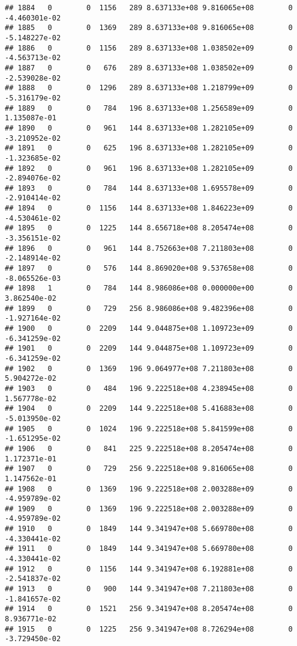\documentclass[
]{article}
\begin{document}
\begin{enumerate}
\begin{verbatim}
## 1884   0        0  1156   289 8.637133e+08 9.816065e+08        0 -4.460301e-02
## 1885   0        0  1369   289 8.637133e+08 9.816065e+08        0 -5.148227e-02
## 1886   0        0  1156   289 8.637133e+08 1.038502e+09        0 -4.563713e-02
## 1887   0        0   676   289 8.637133e+08 1.038502e+09        0 -2.539028e-02
## 1888   0        0  1296   289 8.637133e+08 1.218799e+09        0 -5.316179e-02
## 1889   0        0   784   196 8.637133e+08 1.256589e+09        0  1.135087e-01
## 1890   0        0   961   144 8.637133e+08 1.282105e+09        0 -3.210952e-02
## 1891   0        0   625   196 8.637133e+08 1.282105e+09        0 -1.323685e-02
## 1892   0        0   961   196 8.637133e+08 1.282105e+09        0 -2.894076e-02
## 1893   0        0   784   144 8.637133e+08 1.695578e+09        0 -2.910414e-02
## 1894   0        0  1156   144 8.637133e+08 1.846223e+09        0 -4.530461e-02
## 1895   0        0  1225   144 8.656718e+08 8.205474e+08        0 -3.356151e-02
## 1896   0        0   961   144 8.752663e+08 7.211803e+08        0 -2.148914e-02
## 1897   0        0   576   144 8.869020e+08 9.537658e+08        0 -8.065526e-03
## 1898   1        0   784   144 8.986086e+08 0.000000e+00        0  3.862540e-02
## 1899   0        0   729   256 8.986086e+08 9.482396e+08        0 -1.927164e-02
## 1900   0        0  2209   144 9.044875e+08 1.109723e+09        0 -6.341259e-02
## 1901   0        0  2209   144 9.044875e+08 1.109723e+09        0 -6.341259e-02
## 1902   0        0  1369   196 9.064977e+08 7.211803e+08        0  5.904272e-02
## 1903   0        0   484   196 9.222518e+08 4.238945e+08        0  1.567778e-02
## 1904   0        0  2209   144 9.222518e+08 5.416883e+08        0 -5.013950e-02
## 1905   0        0  1024   196 9.222518e+08 5.841599e+08        0 -1.651295e-02
## 1906   0        0   841   225 9.222518e+08 8.205474e+08        0  1.172371e-01
## 1907   0        0   729   256 9.222518e+08 9.816065e+08        0  1.147562e-01
## 1908   0        0  1369   196 9.222518e+08 2.003288e+09        0 -4.959789e-02
## 1909   0        0  1369   196 9.222518e+08 2.003288e+09        0 -4.959789e-02
## 1910   0        0  1849   144 9.341947e+08 5.669780e+08        0 -4.330441e-02
## 1911   0        0  1849   144 9.341947e+08 5.669780e+08        0 -4.330441e-02
## 1912   0        0  1156   144 9.341947e+08 6.192881e+08        0 -2.541837e-02
## 1913   0        0   900   144 9.341947e+08 7.211803e+08        0 -1.841657e-02
## 1914   0        0  1521   256 9.341947e+08 8.205474e+08        0  8.936771e-02
## 1915   0        0  1225   256 9.341947e+08 8.726294e+08        0 -3.729450e-02

\end{verbatim}
\end{enumerate}
\end{document}
